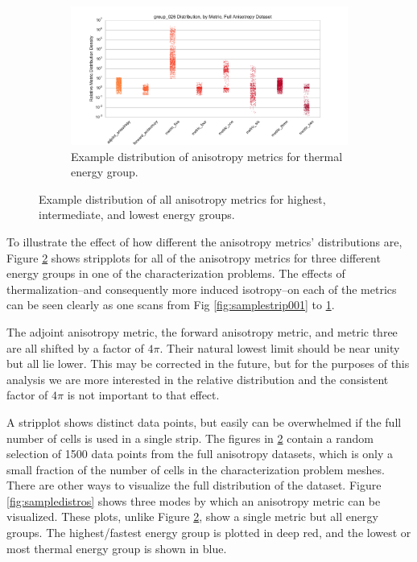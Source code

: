 \begin{figure}[htb!]\ContinuedFloat
  \begin{subfigure}[t]{\textwidth}
    \centering
    \includegraphics[width=0.95\linewidth]{./chapters/characterization_probs/figures/sample_data/group_026_strip_full.pdf}
    \caption{Example distribution of anisotropy metrics for thermal energy group.}
    \label{fig:samplestrip026}
  \end{subfigure}
  \caption[Example distribution of all anisotropy metrics for highest,
  intermediate, and lowest energy groups.]{Example distribution of all
  anisotropy metrics for highest, intermediate, and lowest energy groups.}
  \label{fig:samplestrips}
\end{figure}

To illustrate the effect of how different the anisotropy metrics' distributions
are, Figure \ref{fig:samplestrips} shows stripplots for all of the anisotropy
metrics for three different energy groups in one of the characterization
problems. The effects of thermalization--and consequently more induced
isotropy--on each of the metrics can be seen clearly as one
scans from Fig \ref{fig:samplestrip001} to \ref{fig:samplestrip026}.

The adjoint
anisotropy metric, the forward anisotropy metric, and metric three are all
shifted by a factor of $4\pi$. Their natural lowest limit should be near unity
but all lie lower. This may be corrected in the future, but for the
purposes of this analysis we are more interested in the relative distribution
and the consistent factor of $4\pi$ is not important to that effect.

A stripplot shows distinct data points, but easily can be overwhelmed if the
full number of cells is used in a single strip. The figures in
\ref{fig:samplestrips} contain a random selection of 1500 data points from the
full anisotropy datasets,
which is only a small fraction of the number of cells in the characterization
problem meshes. There are other ways to visualize the full distribution of the
dataset. Figure \ref{fig:sampledistros} shows three modes
by which an anisotropy metric can be visualized.
These plots, unlike Figure \ref{fig:samplestrips}, show a
single metric but all energy groups. The highest/fastest energy group
is plotted in deep red, and the lowest or most thermal
energy group is shown in blue.

